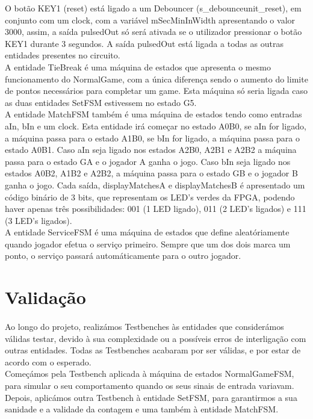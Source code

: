 \documentclass[a4paper, 11pt, oneside]{report}
\begin{document}
\indent O botão KEY1 (reset) está ligado a um Debouncer (s\_debounceunit\_reset), em conjunto com um clock, com a variável mSecMinInWidth apresentando o valor 3000, assim, a saída pulsedOut só será ativada se o utilizador pressionar o botão KEY1 durante 3 segundos. A saída pulsedOut está ligada a todas as outras entidades presentes no circuito. \\
\indent A entidade TieBreak é uma máquina de estados que apresenta o mesmo funcionamento do NormalGame, com a única diferença sendo o aumento do limite de pontos necessários para completar um game. Esta máquina só seria ligada caso as duas entidades SetFSM estivessem no estado G5. \\
\indent A entidade MatchFSM também é uma máquina de estados tendo como entradas aIn, bIn e um clock. Esta entidade irá começar no estado A0B0, se aIn for ligado, a máquina passa para o estado A1B0, se bIn for ligado, a máquina passa para o estado A0B1. Caso aIn seja ligado nos estados A2B0, A2B1 e A2B2 a máquina passa para o estado GA e o jogador A ganha o jogo. Caso bIn seja ligado nos estados A0B2, A1B2 e A2B2, a máquina passa para o estado GB e o jogador B ganha o jogo. Cada saída, displayMatchesA e displayMatchesB é apresentado um código binário de 3 bits, que representam os LED’s verdes da FPGA, podendo haver apenas três possibilidades: 001 (1 LED ligado), 011 (2 LED’s ligados) e 111 (3 LED’s ligados). \\
\indent A entidade ServiceFSM é uma máquina de estados que define aleatóriamente quando jogador efetua o serviço primeiro. Sempre que um dos dois marca um ponto, o serviço passará automáticamente para o outro jogador. \\

\section{Validação}

\paragraph{} Ao longo do projeto, realizámos Testbenches às entidades que considerámos válidas testar, devido à sua complexidade ou a possíveis erros de interligação com outras entidades. Todas as Testbenches acabaram por ser válidas, e por estar de acordo com o esperado. \\
\indent Começámos pela Testbench aplicada à máquina de estados NormalGameFSM, para simular o seu comportamento quando os seus sinais de entrada variavam. Depois, aplicámos outra Testbench à entidade SetFSM, para garantirmos a sua sanidade e a validade da contagem e uma também à entidade MatchFSM. \\
\end{document}
